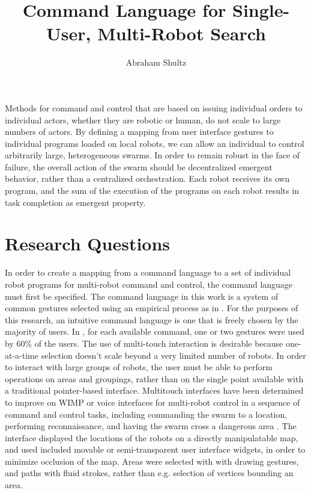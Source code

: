 \documentclass[]{article}
\title{Command Language for Single-User, Multi-Robot Search}
\author{Abraham Shultz}
\begin{document}
\maketitle

\begin{abstract}

\end{abstract}

Methods for command and control that are based on issuing individual orders to individual actors, whether they are robotic or human, do not scale to large numbers of actors. 
By defining a mapping from user interface gestures to individual programs loaded on local robots, we can allow an individual to control arbitrarily large, heterogeneous swarms.
In order to remain robust in the face of failure, the overall action of the swarm should be decentralized emergent behavior, rather than a centralized orchestration. 
Each robot receives its own program, and the sum of the execution of the programs on each robot results in task completion as emergent property.

\section{Research Questions}

In order to create a mapping from a command language to a set of individual robot programs for multi-robot command and control, the command language must first be specified. 
The command language in this work is a system of common gestures selected using an empirical process as in \cite{Micire:2009:ANG:1731903.1731912}. 
For the purposes of this research, an intuitive command language is one that is freely chosen by the majority of users. 
In \cite{Micire:2009:ANG:1731903.1731912}, for each available command, one or two gestures were used by 60\% of the users. 
The use of multi-touch interaction is desirable because one-at-a-time selection doesn't scale beyond a very limited number of robots.
In order to interact with large groups of robots, the user must be able to perform operations on areas and groupings, rather than on the single point available with a traditional pointer-based interface. 
Multitouch interfaces have been determined to improve on WIMP or voice interfaces for multi-robot control in a sequence of command and control tasks, including commanding the swarm to a location, performing reconnaissance, and having the swarm cross a dangerous area \cite{hayes2010multi}.
The interface displayed the locations of the robots on a directly manipulatable map, and used included movable or semi-transparent user interface widgets, in order to minimize occlusion of the map. 
Areas were selected with with drawing gestures, and paths with fluid strokes, rather than e.g. selection of vertices bounding an area.
\end{document}
